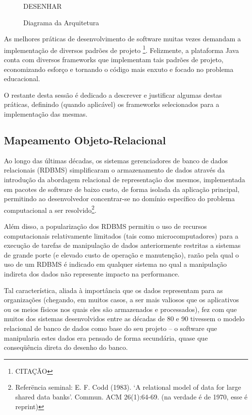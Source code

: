 \documentclass[11pt]{book}
\begin{document}
\begin{figure}[htbp]
\begin{center}
DESENHAR
\caption{Diagrama da Arquitetura}
\label{default}
\end{center}
\end{figure}


As melhores práticas de desenvolvimento de software muitas vezes demandam a implementação de diversos padrões de projeto \footnote{CITAÇÃO}. Felizmente, a plataforma Java conta com diversos frameworks que implementam tais padrões de projeto, economizando esforço e tornando o código mais enxuto e focado no problema educacional.

O restante desta sessão é dedicado a descrever e justificar algumas destas práticas, definindo (quando aplicável) os frameworks selecionados para a implementação das mesmas.

\subsection{Mapeamento Objeto-Relacional}

Ao longo das últimas décadas, os sistemas gerenciadores de banco de dados relacionais (RDBMS)  simplificaram o armazenamento de dados através da introdução da abordagem relacional de representação dos mesmos, implementada em pacotes de software de baixo custo, de forma isolada da aplicação principal, permitindo ao desenvolvedor concentrar-se no domínio específico do problema computacional a ser resolvido\footnote{Referëncia seminal: E. F. Codd (1983). `A relational model of data for large shared data banks'. Commun. ACM 26(1):64-69. (na verdade é de 1970, esse é reprint)}.

Além disso, a popularização dos RDBMS permitiu o uso de recursos computacionais relativamente limitados (tais como microcomputadores) para a execução de tarefas de manipulação de dados anteriormente restritas a sistemas de grande porte (e elevado custo de operação e manutenção), razão pela qual o uso de um RDBMS é indicado em qualquer sistema no qual a manipulação indireta dos dados não represente impacto na performance.

Tal característica, aliada à importância que os dados representam para as organizações (chegando, em muitos casos, a ser mais valiosos que os aplicativos ou os meios físicos nos quais eles são armazenados e processados), fez com que muitos dos sistemas desenvolvidos entre as décadas de 80 e 90 tivessem o modelo relacional de banco de dados como base do seu projeto – o software que manipularia estes dados era pensado de forma secundária, quase que conseqüência direta do desenho do banco.
\end{document}
